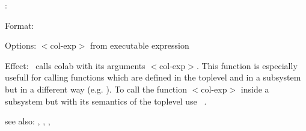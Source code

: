 \colab{} \col:

Format: 

Options: $<$col-exp$>$ from \COLAB{} executable expression

Effect: \col \ calls colab with its arguments $<$col-exp$>$.
        This function is especially usefull for calling functions 
 	which are defined in the \COLAB{} toplevel and in a subsystem 
        but in a different way (e.g. \destroy). To call the 
	function $<$col-exp$>$ inside a subsystem but with its 
        semantics of the \COLAB{} toplevel use \col \ .
       
see also: \rf, \fw, \cn, \tx

